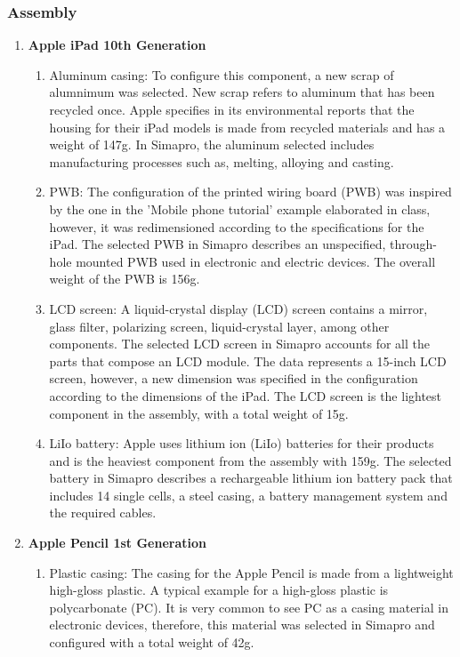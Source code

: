 \subsubsection*{Assembly}
\begin{enumerate}
    \item \textbf{Apple iPad 10th Generation}
    \begin{enumerate}
        \item Aluminum casing: To configure this component, a new scrap of alumnimum was selected. New scrap refers to aluminum that has been recycled once. Apple specifies in its environmental reports that the housing for their iPad models is made from recycled materials and has a weight of 147g. In Simapro, the aluminum selected includes manufacturing processes such as, melting, alloying and casting. 
        \item PWB: The configuration of the printed wiring board (PWB) was inspired by the one in the 'Mobile phone tutorial' example elaborated in class, however, it was redimensioned according to the specifications for the iPad. The selected PWB in Simapro describes an unspecified, through-hole mounted PWB used in electronic and electric devices. The overall weight of the PWB is 156g. 
        \item LCD screen: A liquid-crystal display (LCD) screen contains a mirror, glass filter, polarizing screen, liquid-crystal layer, among other components. The selected LCD screen in Simapro accounts for all the parts that compose an LCD module. The data represents a 15-inch LCD screen, however, a new dimension was specified in the configuration according to the dimensions of the iPad. The LCD screen is the lightest component in the assembly, with a total weight of 15g. 
        \item LiIo battery: Apple uses lithium ion (LiIo) batteries for their products and is the heaviest component from the assembly with 159g. The selected battery in Simapro describes a rechargeable lithium ion battery pack that includes 14 single cells, a steel casing, a battery management system and the required cables. 
    \end{enumerate}
    \item \textbf{Apple Pencil 1st Generation}
    \begin{enumerate}
        \item Plastic casing: The casing for the Apple Pencil is made from a lightweight high-gloss plastic. A typical example for a high-gloss plastic is polycarbonate (PC). It is very common to see PC as a casing material in electronic devices, therefore, this material was selected in Simapro and configured with a total weight of 42g. 

\end{enumerate}
\end{enumerate}
